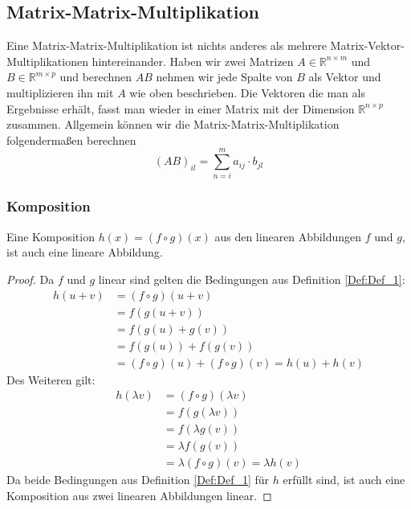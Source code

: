 \subsection{Matrix-Matrix-Multiplikation}
Eine Matrix-Matrix-Multiplikation ist nichts anderes als mehrere Matrix-Vektor-Multiplikationen hintereinander. Haben wir zwei Matrizen $A \in \mathbb{R}^{n \times m}$ und $B \in \mathbb{R}^{m \times p}$ und berechnen $AB$ nehmen wir jede Spalte von $B$ als Vektor und multiplizieren ihn mit $A$ wie oben beschrieben. Die Vektoren die man als Ergebnisse erhält, fasst man wieder in einer Matrix mit der Dimension $\mathbb{R}^{n \times p}$ zusammen. Allgemein können wir die Matrix-Matrix-Multiplikation folgendermaßen berechnen
\begin{equation*}
	(AB)_{il} = \sum_{n=i}^{m}a_{ij} \cdot b_{jl}
\end{equation*}

\subsubsection{Komposition}
\begin{Thm}
Eine Komposition $h(x) = (f \circ g)(x)$ aus den linearen Abbildungen $f$ und $g$, ist auch eine lineare Abbildung.
\end{Thm}

\begin{proof}
Da $f$ und $g$ linear sind gelten die Bedingungen aus Definition \ref{Def:Def_1}:
\begin{align*}
	h(u+v) &= (f \circ g)(u+v)\\
	&= f(g(u+v))\\
	&= f(g(u)+g(v))\\
	&= f(g(u)) + f(g(v))\\
	&= (f\circ g)(u) + (f\circ g)(v) = h(u) + h(v)
\end{align*}
Des Weiteren gilt:
\begin{align*}
	h(\lambda v) &= (f \circ g)(\lambda v)\\
	&=f(g(\lambda v))\\
	&= f(\lambda g(v))\\
	&=\lambda f(g(v))\\
	&=\lambda (f \circ g)(v) = \lambda h(v)
\end{align*}
Da beide Bedingungen aus Definition \ref{Def:Def_1} für $h$ erfüllt sind, ist auch eine Komposition aus zwei linearen Abbildungen linear.
\end{proof}

